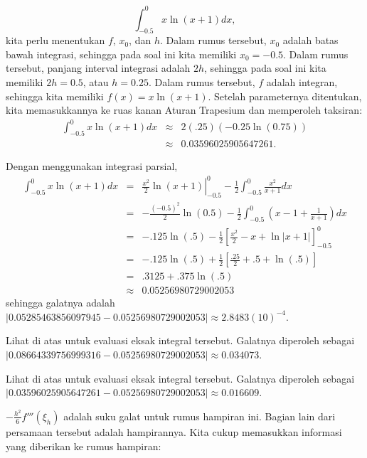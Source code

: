 \begin{description}
\[
{\displaystyle \int_{-0.5}^{0}x\ln(x+1)dx},
\]
kita perlu menentukan $f$, $x_{0}$, dan $h$. Dalam rumus tersebut,
$x_{0}$ adalah batas bawah integrasi, sehingga pada soal ini kita
memiliki $x_{0}=-0.5$. Dalam rumus tersebut, panjang interval integrasi
adalah $2h$, sehingga pada soal ini kita memiliki $2h=0.5$, atau
$h=0.25$. Dalam rumus tersebut, $f$ adalah integran, sehingga kita
memiliki $f(x)=x\ln(x+1)$. Setelah parameternya ditentukan, kita
memasukkannya ke ruas kanan Aturan Trapesium dan memperoleh taksiran:
\begin{eqnarray*}
{\displaystyle \int_{-0.5}^{0}x\ln(x+1)dx} & \approx & 2(.25)(-0.25\ln(0.75))\\
 & \approx & 0.03596025905647261.
\end{eqnarray*}
\item [{\ref{exc:calculusErrors-37}a:}] Dengan menggunakan integrasi parsial,
\begin{eqnarray*}
\int_{-0.5}^{0}x\ln(x+1)dx & = & \left.\frac{x^{2}}{2}\ln(x+1)\right|_{-0.5}^{0}-\frac{1}{2}\int_{-0.5}^{0}\frac{x^{2}}{x+1}dx\\
 & = & -\frac{(-0.5)^{2}}{2}\ln(0.5)-\frac{1}{2}\int_{-0.5}^{0}\left(x-1+\frac{1}{x+1}\right)dx\\
 & = & -.125\ln(.5)-\frac{1}{2}\left[\frac{x^{2}}{2}-x+\ln|x+1|\right]_{-0.5}^{0}\\
 & = & -.125\ln(.5)+\frac{1}{2}\left[\frac{.25}{2}+.5+\ln(.5)\right]\\
 & = & .3125+.375\ln(.5)\\
 & \approx & 0.05256980729002053
\end{eqnarray*}
sehingga galatnya adalah $|0.05285463856097945-0.05256980729002053|\approx2.8483(10)^{-4}$.
\item [{\ref{exc:calculusErrors-38}a:}] Lihat di atas untuk evaluasi eksak
integral tersebut. Galatnya diperoleh sebagai\\
$|0.08664339756999316-0.05256980729002053|\approx0.034073$.
\item [{\ref{exc:calculusErrors-39}a:}] Lihat di atas untuk evaluasi eksak
integral tersebut. Galatnya diperoleh sebagai\\
$|0.03596025905647261-0.05256980729002053|\approx0.016609$.
\item [{\ref{exc:calculusErrors-36}:}] $-\frac{h^{2}}{6}f'''(\xi_{h})$
adalah suku galat untuk rumus hampiran ini. Bagian lain dari persamaan
tersebut adalah hampirannya. Kita cukup memasukkan informasi yang
diberikan ke rumus hampiran: 
\begin{eqnarray*}

\end{eqnarray*}
\end{description}
